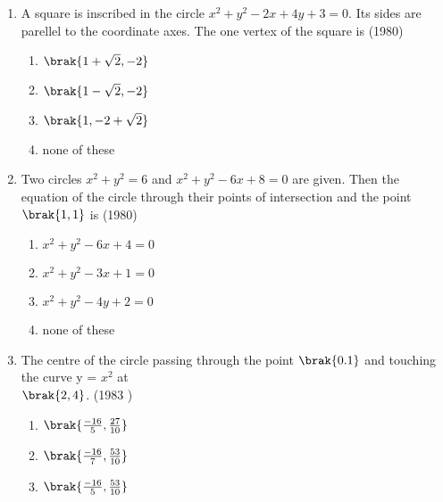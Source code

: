 \begin{enumerate}
\hfill{}
\begin{enumerate}
\end{enumerate}
    \item A square is inscribed in the circle $x^{2} + y^{2} - 2x +4y +3= 0.$ Its sides are parellel to the coordinate axes. The one vertex of the square is \hfill {(1980)}
    \begin{multicols}{2}
    	\begin{enumerate}
    		\item $\brak{1+\sqrt{2},  -2}$ 
    		\item $\brak{1-\sqrt{2},  -2}$
    		\item $\brak{1,  -2 +\sqrt{2}}$
    		\item none of these
    	\end{enumerate}
    \end{multicols}
    \item Two circles $x^{2} + y^{2} = 6$ and $x^{2} + y^{2}-6x +8=0$ are given. Then the equation of the circle through their points of intersection and the point $\brak{1, 1}$ is \hfill {(1980)}
    \begin{enumerate}
    	\item $x^{2}+y^{2}-6x+4=0$ 
    	\item $x^{2}+y^{2}-3x+1=0$
    	\item $x^{2}+y^{2}-4y+2=0$
    	\item none of these
    \end{enumerate}
    \item The centre of the circle passing through the point $\brak{0.1}$ and touching the curve y = $x^{2}$ at \\ $\brak{2, 4}$.
    \hfill {(1983 )}
    \begin{multicols}{2}
    	\begin{enumerate}
    		\item $\brak{\frac{-16}{5}, \frac{27}{10}}$
    		\item $\brak{\frac{-16}{7}, \frac{53}{10}}$
    		\item $\brak{\frac{-16}{5}, \frac{53}{10}}$

\end{enumerate}
\end{multicols}
\end{enumerate}
